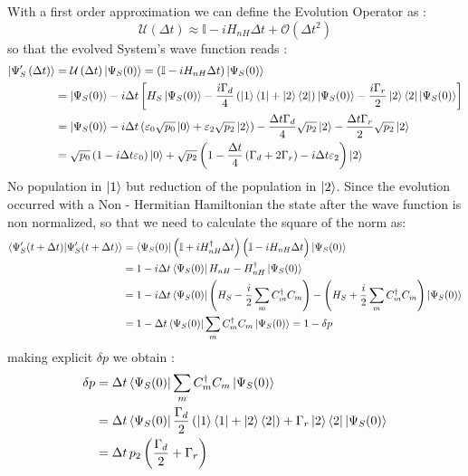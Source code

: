 \documentclass[a4paper,12pt]{article}
\begin{document}
	With a first order approximation we can define the Evolution Operator as : 
	\begin{equation}
		\mathcal{U} \left(\Delta t\right) \approx \mathbb{I} - i H_{nH} \Delta t + \mathcal{O} \left( \Delta t^{2} \right)
	\end{equation}
	so that the evolved System's wave function reads : 
	\begin{align}
		\ket{\Psi_{S}' \left(\Delta t\right)} &= \mathcal{U} \left(\Delta t\right) \ket{\Psi_{S} (0)} = \left( \mathbb{I} - i H_{nH} \Delta t \right) \ket{\Psi_{S} (0)} \notag \\
		&= \ket{\Psi_{S} (0)} - i \Delta t \left[ H_{S} \ket{\Psi_{S} (0)} -  \frac{ i \Gamma_{d}}{4} \left( \ket{1}\bra{1} + \ket{2}\bra{2} \right) \ket{\Psi_{S} (0)} -  \frac{ i \Gamma_{r}}{2} \ket{2}\bra{2}  \ket{\Psi_{S} (0)} \right] \notag \\
		&=  \ket{\Psi_{S} (0)} - i \Delta t \left( \varepsilon_{0} \sqrt{p_{0}} \ket{0} + \varepsilon_{2} \sqrt{p_{2}} \ket{2} \right) - \frac{\Delta t \Gamma_{d}}{4} \sqrt{p_{2}} \ket{2} - \frac{\Delta t \Gamma_{r}}{2} \sqrt{p_{2}} \ket{2} \notag \\
		&= \sqrt{p_{0}} \left( 1 -  i \Delta t \varepsilon_{0} \right) \ket{0} + \sqrt{p_{2}} \left( 1 - \frac{\Delta t}{4} \left(\Gamma_{d} + 2 \Gamma_{r}\right) - i \Delta t \varepsilon_{2} \right) \ket{2}
	\end{align}
	No population in $ \ket{1} $ but reduction of the population in $ \ket{2} $.
	Since the evolution occurred with a Non - Hermitian Hamiltonian the state after the wave function is non normalized, so that we need to calculate the square of the norm  as: 
	\begin{align}
		\braket{\Psi_{S}' (t +\Delta t) | \Psi_{S}' (t +\Delta t)} &= \bra{\Psi_{S} (0)} \left(\mathbb{I} + i H_{nH}^{\dagger} \Delta t \right) \Big(\mathbb{I} - i H_{nH} \Delta t \Big) \ket{\Psi_{S} (0)} \notag \\
		&= 1 - i \Delta t \bra{\Psi_{S} (0)} H_{nH} - H_{nH}^{\dagger} \ket{\Psi_{S} (0)} \notag \\
		&= 1 - i \Delta t \bra{\Psi_{S} (0)}\left( H_{S} - \frac{i}{2} \sum_{m}{C_{m}^{\dagger} C_{m}} \right) - \left( H_{S} + \frac{i}{2} \sum_{m}{C_{m}^{\dagger} C_{m}} \right) \ket{\Psi_{S} (0)} \notag \\ 
		&= 1 - \Delta t \bra{\Psi_{S} (0)} \sum_{m}{C_{m}^{\dagger} C_{m}} \ket{\Psi_{S} (0)} = 1 - \delta p
	\end{align}
	making explicit $ \delta p $ we obtain :
	\begin{align}
		\delta p &= \Delta t \bra{\Psi_{S} (0)} \sum_{m}{C_{m}^{\dagger} C_{m}} \ket{\Psi_{S} (0)} \notag \\
		&= \Delta t \bra{\Psi_{S} (0)} \frac{\Gamma_{d}}{2} \left( \ket{1}\bra{1} + \ket{2}\bra{2} \right) + \Gamma_{r} \ket{2}\bra{2} \ket{\Psi_{S} (0)} \notag \\
		&= \Delta t \, p_{2} \left( \frac{\Gamma_{d}}{2} + \Gamma_{r} \right)
	\end{align}
	
\end{document}

